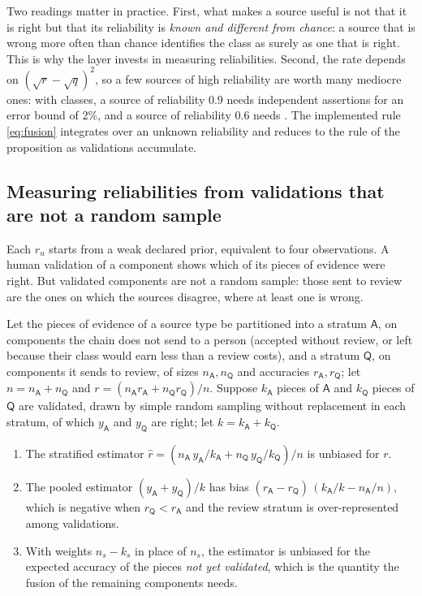Two readings matter in practice. First, what makes a source useful is not that it is right but that its reliability
is \emph{known and different from chance}: a source that is wrong more often than chance identifies the class as
surely as one that is right. This is why the layer invests in measuring reliabilities. Second, the rate depends on
$(\sqrt r-\sqrt q)^2$, so a few sources of high reliability are worth many mediocre ones: with \SynFusionClasses{} classes, a source
of reliability $0.9$ needs \SynFusionKhaut{} independent assertions for an error bound of 2\%, and a source of
reliability $0.6$ needs \SynFusionKbas.
The implemented rule \eqref{eq:fusion} integrates over an unknown reliability and reduces to the rule of the
proposition as validations accumulate.

\subsection{Measuring reliabilities from validations that are not a random sample}

Each $r_u$ starts from a weak declared prior, equivalent to four observations. A human validation of a component
shows which of its pieces of evidence were right. But validated components are not a random sample: those sent to
review are the ones on which the sources disagree, where at least one is wrong.

\begin{proposition}\label{prop:strata}
Let the pieces of evidence of a source type be partitioned into a stratum $\mathsf A$, on components the chain does
not send to a person (accepted without review, or left because their class would earn less than a review costs),
and a stratum $\mathsf Q$, on components it sends to review, of sizes $n_{\mathsf A},n_{\mathsf Q}$
and accuracies $r_{\mathsf A},r_{\mathsf Q}$; let $n=n_{\mathsf A}+n_{\mathsf Q}$ and
$r=(n_{\mathsf A}r_{\mathsf A}+n_{\mathsf Q}r_{\mathsf Q})/n$. Suppose $k_{\mathsf A}$ pieces of $\mathsf A$ and
$k_{\mathsf Q}$ pieces of $\mathsf Q$ are validated, drawn by simple random sampling without replacement in each
stratum, of which $y_{\mathsf A}$ and $y_{\mathsf Q}$ are right; let $k=k_{\mathsf A}+k_{\mathsf Q}$.
\begin{enumerate}\setlength{\itemsep}{0pt}
\item[(i)] The stratified estimator $\hat r=(n_{\mathsf A}\,y_{\mathsf A}/k_{\mathsf A}+n_{\mathsf Q}\,y_{\mathsf Q}/k_{\mathsf Q})/n$
  is unbiased for $r$.
\item[(ii)] The pooled estimator $(y_{\mathsf A}+y_{\mathsf Q})/k$ has bias
  $(r_{\mathsf A}-r_{\mathsf Q})\,(k_{\mathsf A}/k-n_{\mathsf A}/n)$, which is negative when
  $r_{\mathsf Q}<r_{\mathsf A}$ and the review stratum is over-represented among validations.
\item[(iii)] With weights $n_s-k_s$ in place of $n_s$, the estimator is unbiased for the expected accuracy of the
  pieces \emph{not yet validated}, which is the quantity the fusion of the remaining components needs.
\end{enumerate}
\end{proposition}

